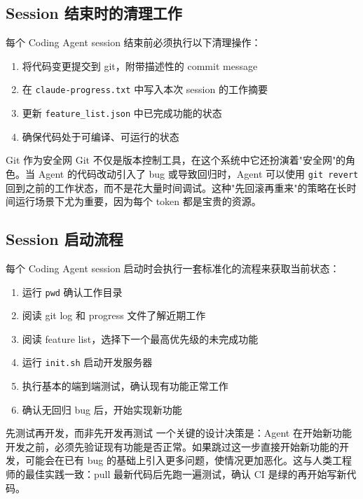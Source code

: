 \documentclass[a4paper]{article}
\begin{document}
\subsection{Session 结束时的清理工作}

每个 Coding Agent session 结束前必须执行以下清理操作：

\begin{enumerate}
    \item 将代码变更提交到 git，附带描述性的 commit message
    \item 在 \texttt{claude-progress.txt} 中写入本次 session 的工作摘要
    \item 更新 \texttt{feature\_list.json} 中已完成功能的状态
    \item 确保代码处于可编译、可运行的状态
\end{enumerate}

\begin{knowledgebox}{Git 作为安全网}
Git 不仅是版本控制工具，在这个系统中它还扮演着"安全网"的角色。当 Agent 的代码改动引入了 bug 或导致回归时，Agent 可以使用 \texttt{git revert} 回到之前的工作状态，而不是花大量时间调试。这种"先回滚再重来"的策略在长时间运行场景下尤为重要，因为每个 token 都是宝贵的资源。
\end{knowledgebox}

\subsection{Session 启动流程}

每个 Coding Agent session 启动时会执行一套标准化的流程来获取当前状态：

\begin{enumerate}
    \item 运行 \texttt{pwd} 确认工作目录
    \item 阅读 git log 和 progress 文件了解近期工作
    \item 阅读 feature list，选择下一个最高优先级的未完成功能
    \item 运行 \texttt{init.sh} 启动开发服务器
    \item 执行基本的端到端测试，确认现有功能正常工作
    \item 确认无回归 bug 后，开始实现新功能
\end{enumerate}

\begin{warningbox}{先测试再开发，而非先开发再测试}
一个关键的设计决策是：Agent 在开始新功能开发之前，必须先验证现有功能是否正常。如果跳过这一步直接开始新功能的开发，可能会在已有 bug 的基础上引入更多问题，使情况更加恶化。这与人类工程师的最佳实践一致：pull 最新代码后先跑一遍测试，确认 CI 是绿的再开始写新代码。
\end{warningbox}
\end{document}
